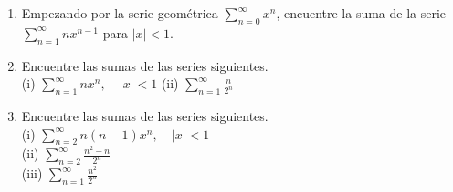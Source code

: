 \item 
    \begin{enumerate}
        \item[(a)] Empezando por la serie geométrica $\displaystyle\sum_{n=0}^\infty x^n$, encuentre la suma de la serie $\displaystyle\sum_{n=1}^\infty n x^{n-1}$ para $|x| < 1$.
        \item[(b)] Encuentre las sumas de las series siguientes. \\
        (i) $\displaystyle\sum_{n=1}^\infty n x^n, \quad |x| < 1$ \qquad\qquad (ii) $\displaystyle\sum_{n=1}^\infty \frac{n}{2^n}$
        \item[(c)] Encuentre las sumas de las series siguientes. \\
        (i) $\displaystyle\sum_{n=2}^\infty n(n-1)x^n, \quad |x| < 1$ \\
        (ii) $\displaystyle\sum_{n=2}^\infty \frac{n^2 - n}{2^n}$ \\
        (iii) $\displaystyle\sum_{n=1}^\infty \frac{n^2}{2^n}$
    \end{enumerate}
